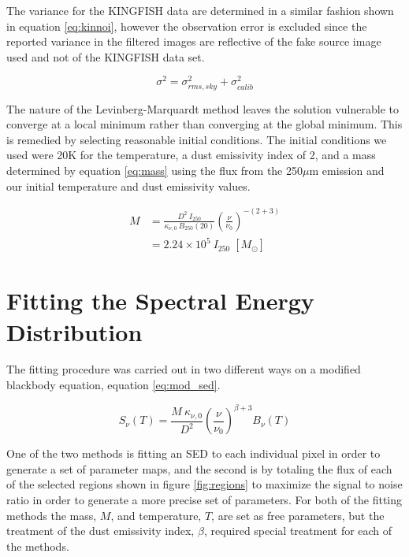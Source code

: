 The variance for the KINGFISH data are determined in a similar fashion shown in equation \ref{eq:kinnoi}, however the observation error is excluded since the reported variance in the filtered images are reflective of the fake source image used and not of the KINGFISH data set.

\begin{equation}\label{eq:kinnoi}
  \sigma^2 = \sigma_{rms,sky}^2 + \sigma_{calib}^2
\end{equation}

The nature of the Levinberg-Marquardt method leaves the solution vulnerable to converge at a local minimum rather than converging at the global minimum.  This is remedied by selecting reasonable initial conditions.  The initial conditions we used were 20K for the temperature, a dust emissivity index of 2, and a mass determined by equation \ref{eq:mass} using the flux from the 250$\mu$m emission and our initial temperature and dust emissivity values.  

\begin{equation}\label{eq:mass}
  \begin{split}
    M & = \frac{D^2 \: I_{250}}{\kappa_{\nu,0} \:  B_{250}\left(20\right)} \left(\frac{\nu}{\nu_0} \right)^{-\left(2+3\right)} \\
      & = 2.24 \times 10^5 \: I_{250} \; \left[M_\odot\right]
  \end{split}
\end{equation}

\section{Fitting the Spectral Energy Distribution}

The fitting procedure was carried out in two different ways on a modified blackbody equation, equation \ref{eq:mod_sed}. 

\begin{equation}\label{eq:mod_sed}
  S_\nu\left(T\right) = \frac{M\:\kappa_{\nu,0}}{D^2}\left(\frac{\nu}{\nu_0}\right)^{\beta+3} B_\nu\left(T\right)
\end{equation}

One of the two methods is fitting an SED to each individual pixel in order to generate a set of parameter maps, and the second is by totaling the flux of each of the selected regions shown in figure \ref{fig:regions} to maximize the signal to noise ratio in order to generate a more precise set of parameters.  For both of the fitting methods the mass, $M$, and temperature, $T$, are set as free parameters, but the treatment of the dust emissivity index, $\beta$, required special treatment for each of the methods.  

